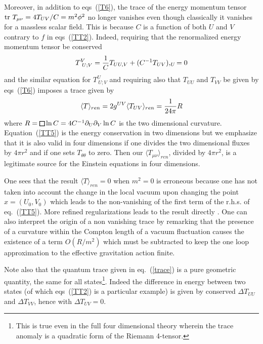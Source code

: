 \documentclass[12pt,oneside]{report}
\def\sqr#1#2{{\vcenter{\vbox{\hrule height.#2pt
          \hbox{\vrule width.#2pt height#1pt \kern#1pt
           \vrule width.#2pt}
           \hrule height.#2pt}}}}
\def\square{\mathchoice\sqr68\sqr68\sqr{4.2}6\sqr{3}6}
\begin{document}
Moreover, in addition to eqs~(\ref{T6}),
 the trace of the energy momentum tensor ${\rm tr} \ T_{\mu\nu} = 4  T_{UV} /C =
m^2 \phi^2$ no longer vanishes even though classically it vanishes for a
massless scalar field.  This is because $C$ is a function of both $U$ and $V$
contrary to $f$ in eqs~(\ref{TT2}). Indeed,  requiring that the renormalized
energy momentum tensor be conserved
 \begin{equation}T^V_{\ U;V} ={1 \over C}T_{UU,V} + (C^{-1} T_{UV}),_U=0
\label{TT5}\end{equation} and the similar equation for $T^U_{\ U;V}$ and
requiring also that $T_{UU}$ and $T_{VV}$ be given by eqs~(\ref{T6}) imposes a trace
given by  \begin{equation} \langle T \rangle_{ren} = 2 g^{UV}  \langle T_{UV}
\rangle _{ren} = {1 \over 24 \pi} R \label{trace} \end{equation} where  $R=
{\square}\ln C = 4 C^{-1} \partial_U\partial_V \ln C$ is the
 two dimensional curvature.  Equation~(\ref{TT5}) is the energy conservation in two
dimensions but we emphasize that
it is also valid in four dimensions if one divides the two dimensional
fluxes by $4 \pi r^2$ and if one sets $T_{\theta \theta}
$ to zero. 
Then our $\langle T_{\mu \nu} \rangle _{ren}$, divided by $4
\pi r^2$,
 is a legitimate source for the Einstein equations in four dimensions.

One sees that the result $\langle T \rangle_{ren}=0$ when $m^2=0$ is erroneous
because one has not taken into account  the change in the local vacuum upon
changing the point $ x= (U_0,V_0)$ which leads to the non-vanishing of
the first term of the r.h.s. of eq.~(\ref{TT5}). More refined regularizations
leads to the result directly \cite{DFU} \cite{BD}. One can also interpret the
origin of a non vanishing trace by remarking that the presence of a curvature
within the Compton length of a vacuum fluctuation causes the existence of a term
$ O(R/m^2)$ which must be subtracted to keep the one loop approximation to the
effective gravitation action finite.

Note also that the 
 quantum trace given in eq.~(\ref{trace}) is  a pure geometric quantity, the 
same for all states\footnote{
This is true even in the full four dimensional theory wherein the trace 
anomaly is a quadratic form of the Riemann 4-tensor.}. Indeed 
the difference in energy between two states (of
which eqs~(\ref{TT2}) is a particular example) is given by conserved $\Delta
T_{UU}$ and $\Delta T_{VV}$, hence with $\Delta T_{UV}=0$.
\end{document}
